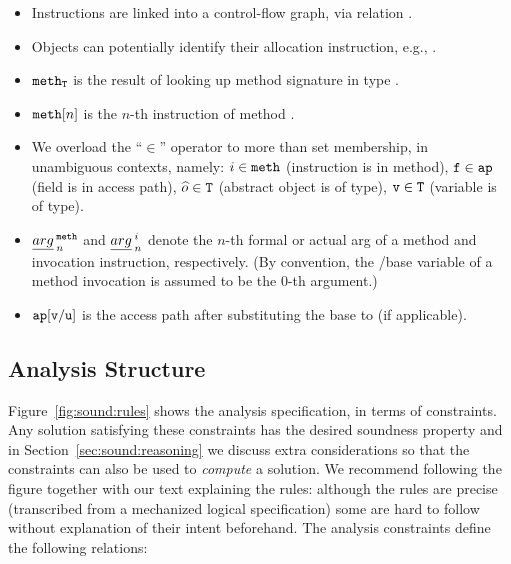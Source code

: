 \begin{itemize}
\item Instructions are linked into a control-flow graph, via relation .

\item Objects can potentially identify their allocation instruction, e.g., .

\item $\texttt{meth}_{\texttt{T}}$ is the result of looking up method signature  in type .

\item $\texttt{meth}[n]$ is the $n$-th instruction of method .

\item We overload the ``$\in$'' operator to more than set membership, in unambiguous contexts, namely: $i \in \texttt{meth}$ (instruction is in method), $\texttt{f} \in \texttt{ap}$ (field is in access path), \(\widehat{o} \in \texttt{T}\) (abstract object is of type), $\texttt{v} \in \texttt{T}$ (variable is of type).

\item ${\emph{arg}}^{\:\texttt{meth}}_{\:n}$ and ${\emph{arg}}^{\:i}_{\:n}$ denote the $n$-th formal or actual arg of a method and invocation instruction, respectively. (By convention, the /base variable of a method invocation is assumed to be the 0-th argument.)

\item $\texttt{ap}[{\texttt{v}}/{\texttt{u}}]$ is the access path  after substituting the base  to  (if applicable).
\end{itemize}


\subsection{Analysis Structure}

Figure~\ref{fig:sound:rules} shows the analysis specification, in terms of constraints. Any solution satisfying these constraints has the desired soundness property and in Section~\ref{sec:sound:reasoning} we discuss extra considerations so that the constraints can also be used to \emph{compute} a solution. We recommend following the figure together with our text explaining the rules: although the rules are precise (transcribed from a mechanized logical specification) some are hard to follow without explanation of their intent beforehand. The analysis constraints define the following relations:

